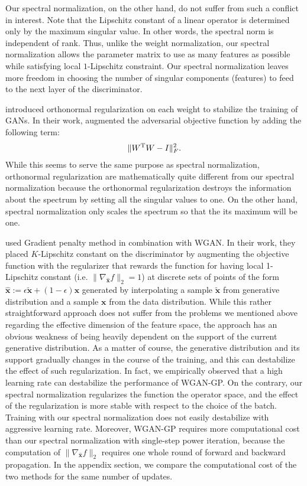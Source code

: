 \documentclass{article}
\newcommand{\bmx}{{\bm x}}
\begin{document}
Our spectral normalization, on the other hand, do not suffer from such a conflict in interest.
Note that the Lipschitz constant of a linear operator is determined only by the maximum singular value.
In other words, the spectral norm is independent of rank.
Thus, unlike the weight normalization, our spectral normalization allows the parameter matrix to use as many features as possible while satisfying local $1$-Lipschitz constraint.
Our spectral normalization leaves more freedom in choosing the number of singular components (features) to feed to the next layer of the discriminator.

\cite{brock2016neural} introduced orthonormal regularization on each weight to stabilize the training of GANs.
In their work, \cite{brock2016neural} augmented the adversarial objective function by adding the following term:
\begin{align}
	\|W^{\rm T} W-I\|_F^2.
\end{align}
While this seems to serve the same purpose as spectral normalization, orthonormal regularization are mathematically quite different from our spectral normalization because the orthonormal regularization destroys the information about the spectrum by setting all the singular values to one. 
On the other hand, spectral normalization only scales the spectrum so that the its maximum will be one. 

\cite{gulrajani2017improved} used Gradient penalty method in combination with WGAN.
In their work, they placed $K$-Lipschitz constant on the discriminator by augmenting the objective function with the regularizer that rewards the function for having local 1-Lipschitz constant (i.e. $\|\nabla_{\hat{\bmx}}f\|_2=1$)  at discrete sets of points of the form $\hat{\bmx} := \epsilon \tilde \bmx + (1- \epsilon) \bmx$ generated by interpolating a sample $\tilde \bmx$ from generative distribution and a sample $\bmx$ from the data distribution.
While this rather straightforward approach does not suffer from the problems we mentioned above regarding the effective dimension of the feature space, the approach has an obvious weakness of being heavily dependent on the support of the current generative distribution.
As a matter of course, the generative distribution and its support gradually changes in the course of the training, and this can destabilize the effect of such regularization.
In fact, we empirically observed that a high learning rate can destabilize the performance of WGAN-GP.
On the contrary, our spectral normalization regularizes the function the operator space, and the effect of the regularization is more stable with respect to the choice of the batch.
Training with our spectral normalization does not easily destabilize with aggressive learning rate.
Moreover, WGAN-GP requires more computational cost than our spectral normalization with single-step power iteration, because the computation of  $\|\nabla_{\hat{\bmx}}f\|_2$ requires one whole round of forward and backward propagation.
In the appendix section, we compare the computational cost of the two methods for the same number of updates.
%
\end{document}
